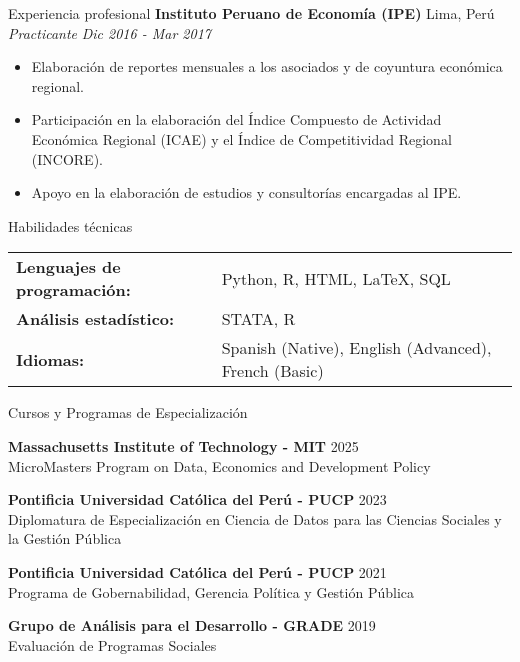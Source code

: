 \documentclass{resume} %
\begin{document}
\begin{rSection}{Experiencia profesional}
    \textbf{Instituto Peruano de Economía (IPE)} \hfill Lima, Perú\\
    \textit{Practicante} \hfill \textit{Dic 2016 - Mar 2017}
    \begin{itemize}
        \itemsep -3pt {} 
        \item Elaboración de reportes mensuales a los asociados y de coyuntura económica regional. 
        \item Participación en la elaboración del Índice Compuesto de Actividad Económica Regional (ICAE) y el Índice de Competitividad Regional (INCORE). 
        \item Apoyo en la elaboración de estudios y consultorías encargadas al IPE.
    \end{itemize}
\end{rSection} 

\begin{rSection}{Habilidades técnicas}
    \begin{tabular}{@{} l l @{}}
    \textbf{Lenguajes de programación:} & Python, R, HTML, \LaTeX, SQL\\
    \textbf{Análisis estadístico:} & STATA, R \\
    \textbf{Idiomas:} & Spanish (Native), English (Advanced), French (Basic)
    \end{tabular}
    \end{rSection}


\begin{rSection}{Cursos y Programas de Especialización}

{\bf Massachusetts Institute of Technology - MIT} \hfill {2025} \\
MicroMasters Program on Data, Economics and Development Policy

{\bf Pontificia Universidad Católica del Perú - PUCP} \hfill {2023}\\
Diplomatura de Especialización en Ciencia de Datos para las Ciencias Sociales y la Gestión Pública

{\bf Pontificia Universidad Católica del Perú - PUCP} \hfill {2021}\\
Programa de Gobernabilidad, Gerencia Política y Gestión Pública

{\bf Grupo de Análisis para el Desarrollo - GRADE} \hfill {2019}\\
Evaluación de Programas Sociales

\end{rSection}
\end{document}
